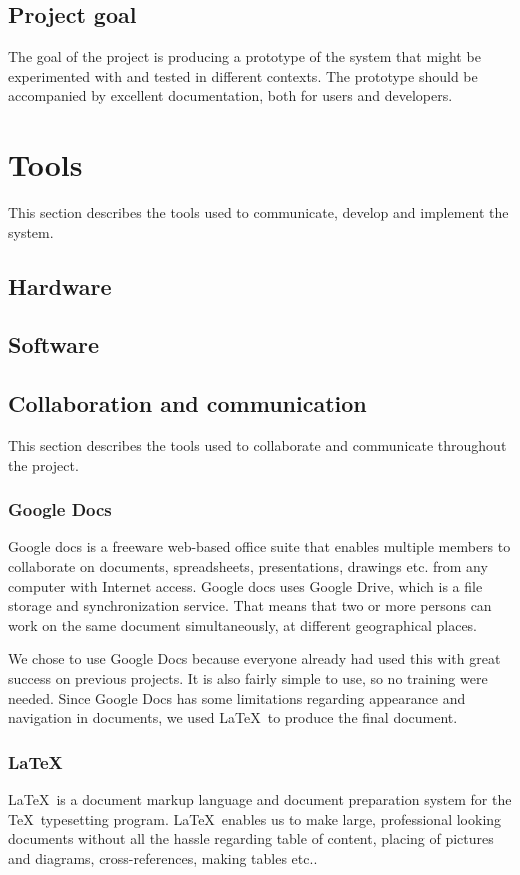 \documentclass[11pt]{book}
\begin{document}
\subsection{Project goal}
The goal of the project is producing a prototype of the system that might be experimented with and tested in different contexts. The prototype should be accompanied by excellent documentation, both for users and developers.

\section{Tools}
This section describes the tools used to communicate, develop and implement the system.

\subsection{Hardware}

\subsection{Software}

\subsection{Collaboration and communication}
This section describes the tools used to collaborate and communicate throughout the project.

\subsubsection{Google Docs}
Google docs is a freeware web-based office suite that enables multiple members to collaborate on documents, spreadsheets, presentations, drawings etc. from any computer with Internet access. Google docs uses Google Drive, which is a file storage and synchronization service. That means that two or more persons can work on the same document simultaneously, at different geographical places. 

We chose to use Google Docs because everyone already had used this with great success on previous projects. It is also fairly simple to use, so no training were needed. Since Google Docs has some limitations regarding appearance and navigation in documents, we used \LaTeX~to produce the final document.

\subsubsection{\LaTeX}
\LaTeX~is a document markup language and document preparation system for the \TeX~typesetting program. \LaTeX~enables us to make large, professional looking documents without all the hassle regarding table of content, placing of pictures and diagrams, cross-references, making tables etc.. 
\end{document}
